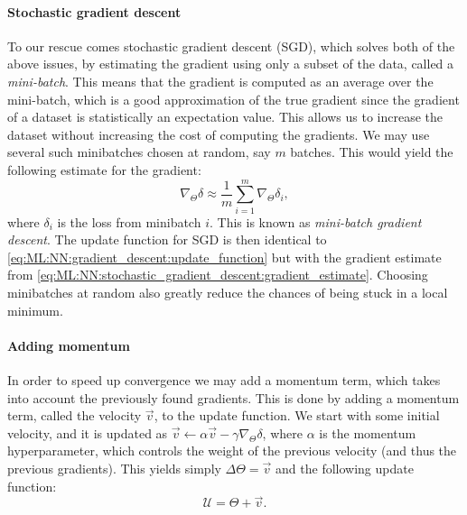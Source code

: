         \paragraph{Stochastic gradient descent}
        To our rescue comes stochastic gradient descent (SGD), which solves both of the above issues, by estimating the gradient using only a subset of the data, called a \textit{mini-batch}. This means that the gradient is computed as an average over the mini-batch, which is a good approximation of the true gradient since the gradient of a dataset is statistically an expectation value. This allows us to increase the dataset without increasing the cost of computing the gradients. We may use several such minibatches chosen at random, say $m$ batches. This would yield the following estimate for the gradient:
        \begin{equation}\label{eq:ML:NN:stochastic_gradient_descent:gradient_estimate}
            \nabla_\Theta\delta \approx \frac{1}{m}\sum_{i=1}^m\nabla_\Theta\delta_i,
        \end{equation}
        where $\delta_i$ is the loss from minibatch $i$. This is known as \textit{mini-batch gradient descent}. The update function for SGD is then identical to \cref{eq:ML:NN:gradient_descent:update_function} but with the gradient estimate from \cref{eq:ML:NN:stochastic_gradient_descent:gradient_estimate}. Choosing minibatches at random also greatly reduce the chances of being stuck in a local minimum. 

        \paragraph{Adding momentum} In order to speed up convergence we may add a momentum term, which takes into account the previously found gradients. This is done by adding a momentum term, called the velocity $\vec{v}$, to the update function. We start with some initial velocity, and it is updated as $\vec{v}\leftarrow \alpha\vec{v}-\gamma\nabla_\Theta\delta$, where $\alpha$ is the momentum hyperparameter, which controls the weight of the previous velocity (and thus the previous gradients). This yields simply $\Delta\Theta = \vec{v}$ and the following update function:
        \begin{equation}\label{eq:ML:NN:stochastic_gradient_descent:momentum:update_function}
            \mathcal{U} = \Theta + \vec{v}.
        \end{equation}

